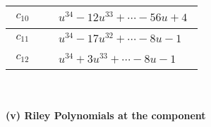 \documentclass[1p]{elsarticle_modified}
\theoremstyle{definition}
\begin{document}
\begin{tabular}{m{50pt}|m{274pt}}
\hline $$\begin{aligned}c_{10}\end{aligned}$$&$\begin{aligned}
&u^{34}-12 u^{33}+\cdots-56 u+4
\end{aligned}$\\
\hline $$\begin{aligned}c_{11}\end{aligned}$$&$\begin{aligned}
&u^{34}-17 u^{32}+\cdots-8 u-1
\end{aligned}$\\
\hline $$\begin{aligned}c_{12}\end{aligned}$$&$\begin{aligned}
&u^{34}+3 u^{33}+\cdots-8 u-1
\end{aligned}$\\
\hline
\end{tabular}\\~\\
\newpage\renewcommand{\arraystretch}{1}
\flushleft \textbf{(v) Riley Polynomials at the component}\newline \\
\end{document}
